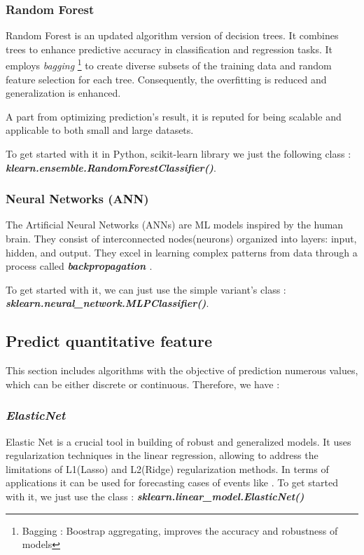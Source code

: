\documentclass[12pt,a4paper]{report}
\begin{document}
\subsubsection{Random Forest}
Random Forest is an updated algorithm version of  decision trees. It combines trees to enhance predictive accuracy in classification and regression tasks. It employs \textit{bagging} \footnote{Bagging : Boostrap aggregating, improves the accuracy and robustness of models}  to create diverse subsets of the training data and random feature selection for each tree\cite{lin2017ensemble}. Consequently, the overfitting is reduced and generalization is enhanced. 

A part from optimizing prediction's result, it is reputed for being scalable and applicable to both small and large datasets. 

To get started with it in Python, scikit-learn library we just the following class : \textbf{\textit{klearn.ensemble.RandomForestClassifier()}}. 
\subsubsection{Neural Networks (ANN)}
The Artificial Neural Networks (ANNs) are ML models inspired by the human brain. They consist of interconnected nodes(neurons) \cite{boateng2020basic} organized into layers: input, hidden, and output. They excel in learning complex patterns from data through a process called \textbf{\textit{backpropagation} \cite{lillicrap2020backpropagation}}. 

To get started with it, we can just use the simple variant's class : \newline \textit{\textbf{sklearn.neural\_network.MLPClassifier()}}.

\subsection{Predict quantitative feature} 
This section includes algorithms with the objective of prediction numerous values, which can be either discrete or continuous. Therefore, we have :
\subsubsection{\textit{ElasticNet}}
Elastic Net is a crucial tool in building of robust and generalized models. It uses regularization techniques in the linear regression, allowing to address the limitations of L1(Lasso) and L2(Ridge) regularization methods. In terms of applications it can be used for forecasting cases of events like \cite{johnsen2020elastic}.
To get started with it, we just use the class : \textit{\textbf{sklearn.linear\_model.ElasticNet()}}
\end{document}
